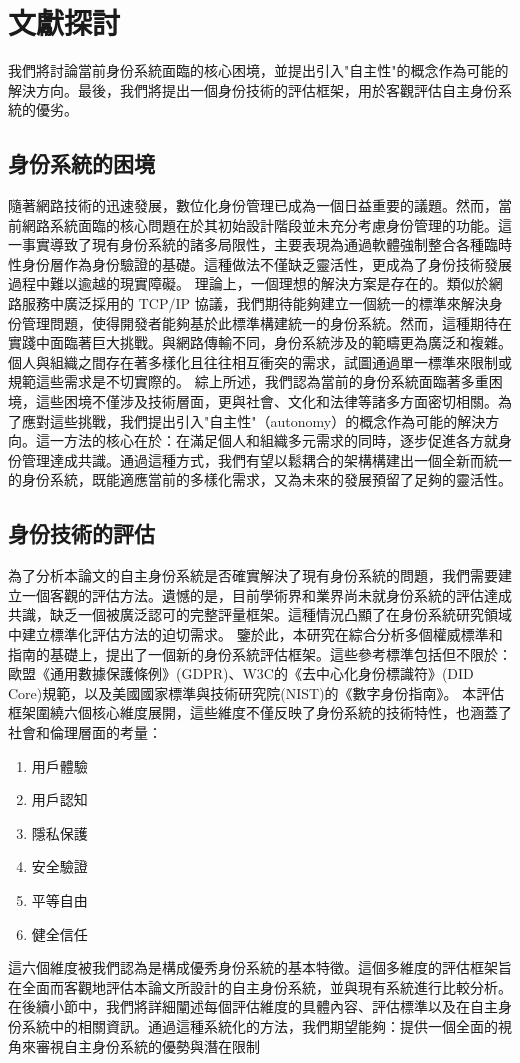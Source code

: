 
\chapter{文獻探討}
我們將討論當前身份系統面臨的核心困境，並提出引入"自主性"的概念作為可能的解決方向。最後，我們將提出一個身份技術的評估框架，用於客觀評估自主身份系統的優劣。
\section{身份系統的困境}
隨著網路技術的迅速發展，數位化身份管理已成為一個日益重要的議題。然而，當前網路系統面臨的核心問題在於其初始設計階段並未充分考慮身份管理的功能\cite{cameron2005laws}。這一事實導致了現有身份系統的諸多局限性，主要表現為通過軟體強制整合各種臨時性身份層作為身份驗證的基礎。這種做法不僅缺乏靈活性，更成為了身份技術發展過程中難以逾越的現實障礙。
理論上，一個理想的解決方案是存在的。類似於網路服務中廣泛採用的 TCP/IP 協議，我們期待能夠建立一個統一的標準來解決身份管理問題，使得開發者能夠基於此標準構建統一的身份系統。然而，這種期待在實踐中面臨著巨大挑戰。與網路傳輸不同，身份系統涉及的範疇更為廣泛和複雜。個人與組織之間存在著多樣化且往往相互衝突的需求，試圖通過單一標準來限制或規範這些需求是不切實際的。
綜上所述，我們認為當前的身份系統面臨著多重困境，這些困境不僅涉及技術層面，更與社會、文化和法律等諸多方面密切相關。為了應對這些挑戰，我們提出引入"自主性"（autonomy）的概念作為可能的解決方向。這一方法的核心在於：在滿足個人和組織多元需求的同時，逐步促進各方就身份管理達成共識。通過這種方式，我們有望以鬆耦合的架構構建出一個全新而統一的身份系統，既能適應當前的多樣化需求，又為未來的發展預留了足夠的靈活性。
\section{身份技術的評估}
為了分析本論文的自主身份系統是否確實解決了現有身份系統的問題，我們需要建立一個客觀的評估方法。遺憾的是，目前學術界和業界尚未就身份系統的評估達成共識，缺乏一個被廣泛認可的完整評量框架。這種情況凸顯了在身份系統研究領域中建立標準化評估方法的迫切需求。
鑒於此，本研究在綜合分析多個權威標準和指南的基礎上，提出了一個新的身份系統評估框架。這些參考標準包括但不限於：歐盟《通用數據保護條例》(GDPR)\cite{GDPR2016}、W3C的《去中心化身份標識符》(DID Core)規範\cite{DIDCore}，以及美國國家標準與技術研究院(NIST)的《數字身份指南》\cite{NIST800-63-3}。
本評估框架圍繞六個核心維度展開，這些維度不僅反映了身份系統的技術特性，也涵蓋了社會和倫理層面的考量：
\begin{enumerate}
  \item 用戶體驗
  \item 用戶認知
  \item 隱私保護
  \item 安全驗證
  \item 平等自由
  \item 健全信任
\end{enumerate}
這六個維度被我們認為是構成優秀身份系統的基本特徵。這個多維度的評估框架旨在全面而客觀地評估本論文所設計的自主身份系統，並與現有系統進行比較分析。
在後續小節中，我們將詳細闡述每個評估維度的具體內容、評估標準以及在自主身份系統中的相關資訊。通過這種系統化的方法，我們期望能夠：提供一個全面的視角來審視自主身份系統的優勢與潛在限制
